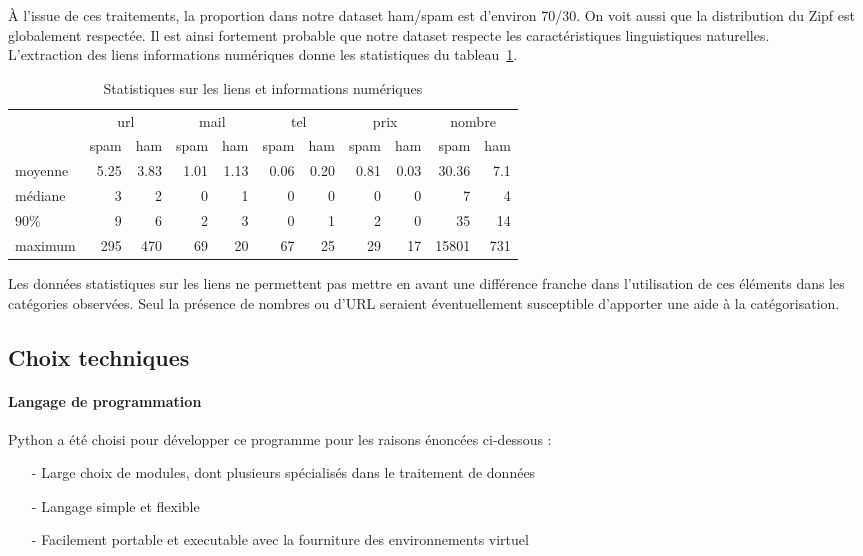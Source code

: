     À l'issue de ces traitements, la proportion dans notre dataset ham/spam est d'environ 70/30.
    On voit aussi que la distribution du Zipf est globalement respectée.
    Il est ainsi fortement probable que notre dataset respecte les caractéristiques linguistiques naturelles.\\

    L'extraction des liens informations numériques donne les statistiques du tableau~\ref{tab:p1liens}.
    \begin{table}[H]
        \centering
        \begin{tabular}{l|rr|rr|rr|rr|rr}
            & \multicolumn{2}{c}{url} & \multicolumn{2}{c}{mail} & \multicolumn{2}{c}{tel} & \multicolumn{2}{c}{prix} & \multicolumn{2}{c}{nombre}\\
            & spam & ham & spam & ham & spam & ham & spam & ham & spam & ham\\
            \hline
            moyenne & 5.25 & 3.83 & 1.01 & 1.13 & 0.06 & 0.20 & 0.81 & 0.03 & 30.36 & 7.1\\
            médiane & 3 & 2 & 0 & 1 & 0 & 0 & 0 & 0 & 7 & 4\\
            90\% & 9 & 6 & 2 & 3 & 0 & 1 & 2 & 0 & 35 & 14\\
            maximum & 295 & 470 & 69 & 20 & 67 & 25 & 29 & 17 & 15801 & 731\\
        \end{tabular}
        \caption{Statistiques sur les liens et informations numériques}
        \label{tab:p1liens}
    \end{table}
    Les données statistiques sur les liens ne permettent pas mettre en avant une différence franche dans l'utilisation de ces éléments dans les catégories observées.
    Seul la présence de nombres ou d'URL seraient éventuellement susceptible d'apporter une aide à la catégorisation.


\subsection*{Choix techniques}
    \paragraph{Langage de programmation}
        Python a été choisi pour développer ce programme pour les raisons énoncées ci-dessous :
        \begin{itemize}
            \item[-] Large choix de modules, dont plusieurs spécialisés dans le traitement de données
            \item[-] Langage simple et flexible
            \item[-] Facilement portable et executable avec la fourniture des environnements virtuel
        \end{itemize}

